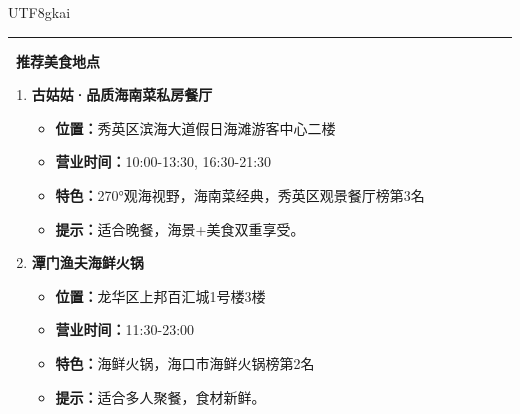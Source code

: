 \begin{CJK*}{UTF8}{gkai}
\begin{tcolorbox}[
    breakable,
    enhanced,
    colframe=color_amapblue,
    colback=mycolor,
    coltitle=white,
    title = {\textbf{Case Study: Route-based Dining Recommendation}},
    fonttitle=\bfseries
]
\begin{tcolorbox}[colback=white, colframe=color_amapblue!30!white, arc=4pt, boxrule=1pt, left=4pt, right=4pt, top=4pt, bottom=4pt]
    \par\noindent\rule{\textwidth}{0.4pt} %
    
    \textbf{\textcolor{color_amapblue}{\faUtensils\ 推荐美食地点}}
    \begin{enumerate}[leftmargin=15pt, itemsep=4pt, topsep=2pt]
    \item \textbf{古姑姑·品质海南菜私房餐厅}
    \begin{itemize}[leftmargin=10pt, label={\tiny\textbullet}, itemsep=0pt, parsep=0pt]
        \item \textbf{位置：}秀英区滨海大道假日海滩游客中心二楼
        \item \textbf{营业时间：}10:00-13:30, 16:30-21:30
        \item \textbf{特色：}270°观海视野，海南菜经典，秀英区观景餐厅榜第3名
        \item \textbf{提示：}适合晚餐，海景+美食双重享受。
    \end{itemize}

    \item \textbf{潭门渔夫海鲜火锅}
    \begin{itemize}[leftmargin=10pt, label={\tiny\textbullet}, itemsep=0pt, parsep=0pt]
        \item \textbf{位置：}龙华区上邦百汇城1号楼3楼
        \item \textbf{营业时间：}11:30-23:00
        \item \textbf{特色：}海鲜火锅，海口市海鲜火锅榜第2名
        \item \textbf{提示：}适合多人聚餐，食材新鲜。
    \end{itemize}


\end{enumerate}
\end{tcolorbox}
\end{tcolorbox}
\end{CJK*}
